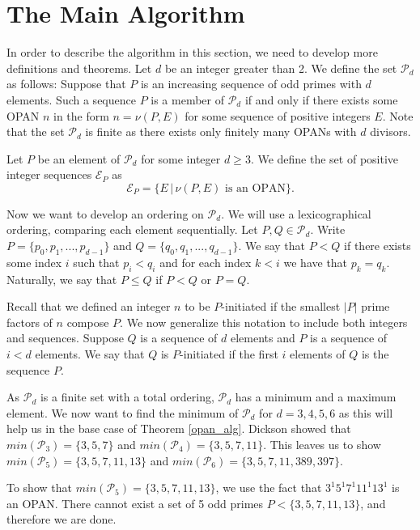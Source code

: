 \documentclass[../paper.tex]{subfiles}
\begin{document}
\section{The Main Algorithm}

In order to describe the algorithm in this section, we need to
develop more definitions and theorems. Let $d$ be an integer
greater than 2. We define the set $\mathcal{P}_d$ as follows: 
Suppose that $P$ is an increasing sequence of odd primes with 
$d$ elements. Such a sequence $P$ is a member of 
$\mathcal{P}_d$ if and only if there exists some OPAN $n$ in the 
form $n = \nu (P, E)$ for some sequence of positive integers $E$.
Note that the set $\mathcal{P}_d$ is finite as there exists only 
finitely many OPANs with $d$ divisors{\cite{dickson}}.

Let $P$ be an element of $\mathcal{P}_d$ for some integer $d \geq 
3$. We define the set of positive integer sequences 
$\mathcal{E}_P$ as 
%
$$\mathcal{E}_P = \{E\, |\, \nu(P, E) \text{ is an OPAN}\}.$$
%

Now we want to develop an ordering on $\mathcal{P}_d$. We will use
a lexicographical ordering, comparing each element sequentially.
Let $P, Q \in \mathcal{P}_d$. Write $P = \{p_0, p_1, ..., p_{d-1}\}$
and $Q = \{q_0, q_1, ..., q_{d-1}\}$. We say that $P < Q$ if 
there exists some index $i$ such that $p_i < q_i$ and for each
index $k < i$ we have that $p_k = q_k$. Naturally, we say that 
$P \leq Q$ if $P < Q$ or $P = Q$. 

Recall that we defined an integer $n$ to be $P$-initiated if the
smallest $|P|$ prime factors of $n$ compose $P$. We now generalize
this notation to include both integers and sequences. Suppose $Q$
is a sequence of $d$ elements and $P$ is a sequence of $i < d$
elements. We say that $Q$ is $P$-initiated if the first $i$
elements of $Q$ is the sequence $P$.

As $\mathcal{P}_d$ is a finite set with a total ordering,
$\mathcal{P}_d$ has a minimum and a maximum element. We now want
to find the minimum of $\mathcal{P}_d$ for $d = 3, 4, 5, 6$ as
this will help us in the base case of Theorem {\ref{opan_alg}}.
Dickson showed that $min(\mathcal{P}_3) = \{3, 5, 7\}$ and
$min(\mathcal{P}_4) = \{3, 5, 7, 11\}$. This leaves us to show
$min(\mathcal{P}_5) = \{3, 5, 7, 11, 13\}$ and $min(\mathcal{P}_6)
= \{3, 5, 7, 11, 389, 397\}$.

To show that $min(\mathcal{P}_5) = \{3, 5, 7, 11, 13\}$, we use
the fact that $3^1 5^1 7^1 11^1 13^1$ is an OPAN. There cannot
exist a set of 5 odd primes $P < \{3, 5, 7, 11, 13\}$, and
therefore we are done.
\end{document}
